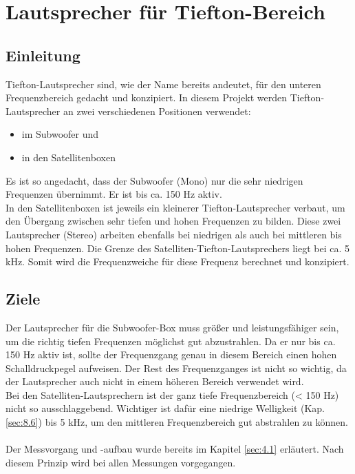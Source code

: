 \section{Lautsprecher für Tiefton-Bereich} \label{sec:4.2}
\subsection*{Einleitung} \label{subsec:4.2.1}

Tiefton-Lautsprecher sind, wie der Name bereits andeutet, für den unteren Frequenzbereich gedacht und konzipiert.
In diesem Projekt werden Tiefton-Lautsprecher an zwei verschiedenen Positionen verwendet:
\begin{itemize}
	\item im Subwoofer und 
	\item in den Satellitenboxen
\end{itemize}
Es ist so angedacht, dass der Subwoofer (Mono) nur die sehr niedrigen Frequenzen übernimmt.
Er ist bis ca. 150 Hz aktiv.\\
In den Satellitenboxen ist jeweils ein kleinerer Tiefton-Lautsprecher verbaut, um den Übergang zwischen sehr tiefen und hohen Frequenzen zu bilden.
Diese zwei Lautsprecher (Stereo) arbeiten ebenfalls bei niedrigen als auch bei mittleren bis hohen Frequenzen.
Die Grenze des Satelliten-Tiefton-Lautsprechers liegt bei ca. 5 kHz.
Somit wird die Frequenzweiche für diese Frequenz berechnet und konzipiert.
\subsection*{Ziele} \label{subsec:4.2.2}
Der Lautsprecher für die Subwoofer-Box muss größer und leistungsfähiger sein, um die richtig tiefen Frequenzen möglichst gut abzustrahlen.
Da er nur bis ca. 150 Hz aktiv ist, sollte der Frequenzgang genau in diesem Bereich einen hohen Schalldruckpegel aufweisen.
Der Rest des Frequenzganges ist nicht so wichtig, da der Lautsprecher auch nicht in einem höheren Bereich verwendet wird. \\
Bei den Satelliten-Lautsprechern ist der ganz tiefe Frequenzbereich (< 150 Hz) nicht so ausschlaggebend.
Wichtiger ist dafür eine niedrige Welligkeit (Kap. \ref{sec:8.6}) bis 5 kHz, um den mittleren Frequenzbereich gut abstrahlen zu können.\\ \\
Der Messvorgang und -aufbau wurde bereits im Kapitel \ref{sec:4.1} erläutert.
Nach diesem Prinzip wird bei allen Messungen vorgegangen.

